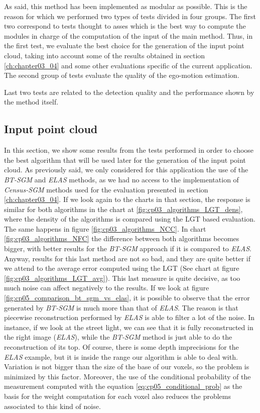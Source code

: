 As said, this method has been implemented as modular as possible. This is the reason for which we performed two types of tests divided in four groups. The first two correspond to tests thought to asses which is the best way to compute the modules in charge of the computation of the input of the main method. Thus, in the first test, we evaluate the best choice for the generation of the input point cloud, taking into account some of the results obtained in section \ref{ch:chapter03_04} and some other evaluations specific of the current application. The second group of tests evaluate the quality of the ego-motion estimation. 

Last two tests are related to the detection quality and the performance shown by the method itself.

\subsection{Input point cloud}\label{ch:chapter05_02_01}

In this section, we show some results from the tests performed in order to choose the best algorithm that will be used later for the generation of the input point cloud. As previously said, we only considered for this application the use of the \emph{BT-SGM} and \emph{ELAS} methods, as we had no access to the implementation of \emph{Census-SGM} methods used for the evaluation presented in section \ref{ch:chapter03_04}. If we look again to the charts in that section, the response is similar for both algorithms in the chart at \ref{fig:cp03_algorithms_LGT_dens}, where the density of the algorithms is compared using the \ac{LGT} based evaluation. The same happens in figure \ref{fig:cp03_algorithms_NCC}. In chart \ref{fig:cp03_algorithms_NFC} the difference between both algorithms becomes bigger, with better results for the \emph{BT-SGM} approach if it is compared to \emph{ELAS}. Anyway, results for this last method are not so bad, and they are quite better if we attend to the average error computed using the \ac{LGT} (See chart at figure \ref{fig:cp03_algorithms_LGT_avg}). This last measure is quite decisive, as too much noise can affect negatively to the results. If we look at figure \ref{fig:cp05_comparison_bt_sgm_vs_elas}, it is possible to observe that the error generated by \emph{BT-SGM} is much more than that of \emph{ELAS}. The reason is that piecewise reconstruction performed by \emph{ELAS} is able to filter a lot of the noise. In instance, if we look at the street light, we can see that it is fully reconstructed in the right image (\emph{ELAS}), while the \emph{BT-SGM} method is just able to do the reconstruction of its top. Of course, there is some depth imprecisions for the \emph{ELAS} example, but it is inside the range our algorithm is able to deal with. Variation is not bigger than the size of the base of our voxels, so the problem is minimized by this factor. Moreover, the use of the conditional probability of the measurement computed with the equation \ref{eq:cp05_conditional_prob} as the basis for the weight computation for each voxel also reduces the problems associated to this kind of noise.

